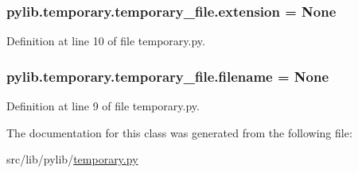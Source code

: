 \subsubsection[{\texorpdfstring{extension}{extension}}]{\setlength{\rightskip}{0pt plus 5cm}pylib.\+temporary.\+temporary\+\_\+file.\+extension = None\hspace{0.3cm}{\ttfamily [static]}}\hypertarget{classpylib_1_1temporary_1_1temporary__file_a4662cc55e879791c5931ab72ad40eed3}{}\label{classpylib_1_1temporary_1_1temporary__file_a4662cc55e879791c5931ab72ad40eed3}


Definition at line 10 of file temporary.\+py.

\subsubsection[{\texorpdfstring{filename}{filename}}]{\setlength{\rightskip}{0pt plus 5cm}pylib.\+temporary.\+temporary\+\_\+file.\+filename = None\hspace{0.3cm}{\ttfamily [static]}}\hypertarget{classpylib_1_1temporary_1_1temporary__file_aed23d05f04833724e81e41d80363a65c}{}\label{classpylib_1_1temporary_1_1temporary__file_aed23d05f04833724e81e41d80363a65c}


Definition at line 9 of file temporary.\+py.



The documentation for this class was generated from the following file\+:\begin{DoxyCompactItemize}
\item 
src/lib/pylib/\hyperlink{temporary_8py}{temporary.\+py}\end{DoxyCompactItemize}
